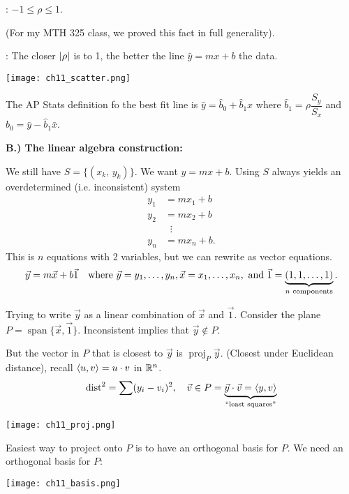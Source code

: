 \nnl {}: $-1 \leq \rho \leq 1$.

\nl (For my MTH 325 class, we proved this fact in full generality).

\nnl {}: The closer $\abs{\rho}$ is to 1, the better the line $\widehat{y} = mx+b$  the data.
\begin{center}\texttt{[image: ch11\_scatter.png]}\end{center}

\nl The AP Stats definition fo the best fit line is $\widehat{y} = \widehat{b}_0 + \widehat{b}_1x$ where $\widehat{b}_1 = \rho \dfrac{S_y}{S_x}$ and $\widehat{b}_0 = \bar{y} - \widehat{b}_1 \bar{x}$.

\nnl\textbf{B.) The linear algebra construction:}

\nl We still have $S = \{(x_k,\, y_k)\}$. We want $y = mx+b$. Using $S$ always yields an overdetermined (i.e. inconsistent) system
\begin{align*}
    y_1 &= mx_1 + b\\
    y_2 &= mx_2 + b\\
    & \;\;\vdots\\
    y_n &= mx_n + b.
\end{align*}
This is $n$ equations with 2 variables, but we can rewrite as vector equations. $$\vec{y} = m\vec{x} + b \vec{1} \quad \text{where } \vec{y} = {y}_1, \dots, {y}_n, \vec{x} = {x}_1, \dots, {x}_n, \text{ and } \vec{1} = \underbrace{(1,1,\dots,1)}_{n \text{ components}}.$$

\nl Trying to write $\vec{y}$ as a linear combination of $\vec{x}$ and $\vec{1}$. Consider the plane $P = \operatorname{span}\{\vec{x},\vec{1}\}$. Inconsistent implies that $\vec{y} \not \in P$.

\nl But the vector in $P$ that is closest to $\vec{y}$ is $\operatorname{proj}_P\vec{y}$. (Closest under Euclidean distance), recall $\inner{u,v} = u \cdot v$ in $\mathbb{R}^n$.
$$\operatorname{dist}^2 = \sum (y_i - v_i)^2, \quad \vec{v} \in P = \underbrace{\vec{y} \cdot \vec{v} = \inner{y,v}}_{\substack{\text{\say{least squares}}}}$$
\begin{center}\texttt{[image: ch11\_proj.png]}\end{center}

\noindent Easiest way to project onto $P$ is to have an orthogonal basis for $P$. We need an orthogonal basis for $P$: 
\begin{center}\texttt{[image: ch11\_basis.png]}\end{center}

